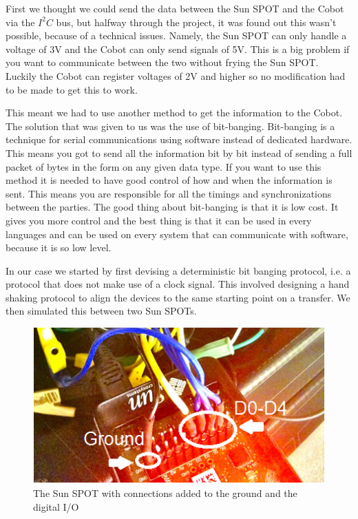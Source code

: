 \documentclass[a4paper,10pt]{article} %
\begin{document}
First we thought we could send the data between the Sun SPOT and the Cobot via
the $I^2C$ bus, but halfway through the project, it was found out this wasn't
possible, because of a technical issues. Namely, the Sun SPOT can only handle a
voltage of 3V and the Cobot can only send signals of 5V. This is a big problem
if you want to communicate between the two without frying the Sun SPOT. Luckily
the Cobot can register voltages of 2V and higher so no modification had to be
made to get this to work.

This meant we had to use another method to get the information to the Cobot. The
solution that was given to us was the use of bit-banging. Bit-banging is a
technique for serial communications using software instead of dedicated
hardware. This means you got to send all the information bit by bit instead of
sending a full packet of bytes in the form on any given data type. If you want
to use this method it is needed to have good control of how and when the
information is sent. This means you are responsible for all the timings and
synchronizations between the parties. The good thing about bit-banging is that
it is low cost. It gives you more control and the best thing is that it can be
used in every languages and can be used on every system that can communicate
with software, because it is so low level.

In our case we started by first devising a deterministic bit banging protocol,
i.e. a protocol that does not make use of a clock signal. This involved
designing a hand shaking protocol to align the devices to the same starting
point on a transfer. We then simulated this between two Sun SPOTs.

\begin{figure}[H]
\label{fig:sunspotconnections}
\centering
\includegraphics{img/sunspotconnections1.png}
\caption{The Sun SPOT with connections added to the ground and the digital
I/O}
\end{figure}
\end{document}
